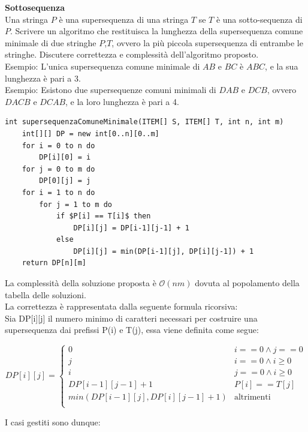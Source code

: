\documentclass[../cheatSheetAlgoritmi.tex]{subfiles}
\begin{document}
\textbf{Sottosequenza}\\
Una stringa $P$ è una supersequenza di una stringa $T$ se $T$ è una sotto-sequenza di $P$. Scrivere un algoritmo che restituisca la lunghezza della supersequenza comune minimale di due stringhe $P$,$T$, ovvero la più piccola supersequenza di entrambe le stringhe. Discutere correttezza e complessità dell'algoritmo proposto.\\
Esempio: L'unica supersequenza comune minimale di $AB$ e $BC$ è $ABC$, e la sua lunghezza è pari a 3.\\
Esempio: Esistono due supersequenze comuni minimali di $DAB$ e $DCB$, ovvero $DACB$ e $DCAB$, e la loro lunghezza è pari a 4.
\begin{lstlisting}[caption=Supersequenza comune minimale]
int supersequenzaComuneMinimale(ITEM[] S, ITEM[] T, int n, int m) 
    int[][] DP = new int[0..n][0..m]
    for i = 0 to n do
        DP[i][0] = i
    for j = 0 to m do
        DP[0][j] = j
    for i = 1 to n do
        for j = 1 to m do 
            if $P[i] == T[i]$ then 
                DP[i][j] = DP[i-1][j-1] + 1
            else
                DP[i][j] = min(DP[i-1][j], DP[i][j-1]) + 1
    return DP[n][m]
\end{lstlisting}
La complessità della soluzione proposta è $\mathcal{O}(nm)$ dovuta al popolamento della tabella delle soluzioni. \\
La correttezza è rappresentata dalla seguente formula ricorsiva: \\
Sia DP[i][j] il numero minimo di caratteri necessari per costruire una supersequenza dai prefissi P(i) e T(j), essa viene definita come segue: 


\begin{equation*}
    DP[i][j]=\begin{cases}
        0 & \text{$i == 0 \land j == 0$} \\
        j & \text{$i == 0 \land i \geq 0$} \\
        i & \text{$j == 0 \land i \geq 0$} \\
        DP[i-1][j-1] + 1 & \text{$P[i] == T[j]$} \\
        min(DP[i-1][j], DP[i][j-1] + 1) & \text{altrimenti} \\
    \end{cases}
\end{equation*}

I casi gestiti sono dunque:
\end{document}
